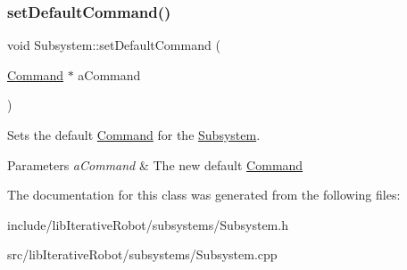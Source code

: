 \subsubsection{\texorpdfstring{setDefaultCommand()}{setDefaultCommand()}}
{\footnotesize\ttfamily void Subsystem\+::set\+Default\+Command (\begin{DoxyParamCaption}\item[{\mbox{\hyperlink{classlib_iterative_robot_1_1_command}{Command}} $\ast$}]{a\+Command }\end{DoxyParamCaption})\hspace{0.3cm}{\ttfamily [protected]}}



Sets the default \mbox{\hyperlink{classlib_iterative_robot_1_1_command}{Command}} for the \mbox{\hyperlink{classlib_iterative_robot_1_1_subsystem}{Subsystem}}. 


\begin{DoxyParams}{Parameters}
{\em a\+Command} & The new default \mbox{\hyperlink{classlib_iterative_robot_1_1_command}{Command}} \\
\hline
\end{DoxyParams}


The documentation for this class was generated from the following files\+:\begin{DoxyCompactItemize}
\item 
include/lib\+Iterative\+Robot/subsystems/Subsystem.\+h\item 
src/lib\+Iterative\+Robot/subsystems/Subsystem.\+cpp\end{DoxyCompactItemize}
